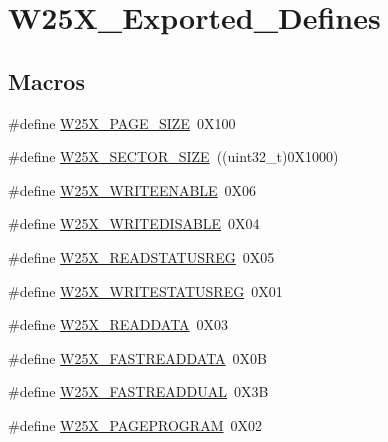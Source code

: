 \hypertarget{group___w25_x___exported___defines}{}\section{W25\+X\+\_\+\+Exported\+\_\+\+Defines}
\label{group___w25_x___exported___defines}
\subsection*{Macros}
\begin{DoxyCompactItemize}
\item 
\#define \mbox{\hyperlink{group___w25_x___exported___defines_gafe05e14fee7754524c66b25d6b242dd9}{W25\+X\+\_\+\+P\+A\+G\+E\+\_\+\+S\+I\+ZE}}~0\+X100
\item 
\#define \mbox{\hyperlink{group___w25_x___exported___defines_ga128f8ddbc194d58e29f22bd99787ac14}{W25\+X\+\_\+\+S\+E\+C\+T\+O\+R\+\_\+\+S\+I\+ZE}}~((uint32\+\_\+t)0\+X1000)
\item 
\#define \mbox{\hyperlink{group___w25_x___exported___defines_ga6b291355fa27a76d8d5ea0e9c5650266}{W25\+X\+\_\+\+W\+R\+I\+T\+E\+E\+N\+A\+B\+LE}}~0\+X06
\item 
\#define \mbox{\hyperlink{group___w25_x___exported___defines_gaaf0377cbabe7ea71a6ddc3f0bb20452a}{W25\+X\+\_\+\+W\+R\+I\+T\+E\+D\+I\+S\+A\+B\+LE}}~0\+X04
\item 
\#define \mbox{\hyperlink{group___w25_x___exported___defines_ga48ec90c473b58bcd5c80d58ce50c94ff}{W25\+X\+\_\+\+R\+E\+A\+D\+S\+T\+A\+T\+U\+S\+R\+EG}}~0\+X05
\item 
\#define \mbox{\hyperlink{group___w25_x___exported___defines_gaacd4fb074e82ca2bc5c61111b7c58fba}{W25\+X\+\_\+\+W\+R\+I\+T\+E\+S\+T\+A\+T\+U\+S\+R\+EG}}~0\+X01
\item 
\#define \mbox{\hyperlink{group___w25_x___exported___defines_ga431a55943c254095e35bcda2996f5441}{W25\+X\+\_\+\+R\+E\+A\+D\+D\+A\+TA}}~0\+X03
\item 
\#define \mbox{\hyperlink{group___w25_x___exported___defines_ga22b7a3c2d9ba8d4c7f14f0da7a0bbe25}{W25\+X\+\_\+\+F\+A\+S\+T\+R\+E\+A\+D\+D\+A\+TA}}~0\+X0B
\item 
\#define \mbox{\hyperlink{group___w25_x___exported___defines_gacdebd2c7222448f6f65212f5ca211786}{W25\+X\+\_\+\+F\+A\+S\+T\+R\+E\+A\+D\+D\+U\+AL}}~0\+X3B
\item 
\#define \mbox{\hyperlink{group___w25_x___exported___defines_gae35a7c28ebbb87e7fa95f50d947edd14}{W25\+X\+\_\+\+P\+A\+G\+E\+P\+R\+O\+G\+R\+AM}}~0\+X02

\end{DoxyCompactItemize}
